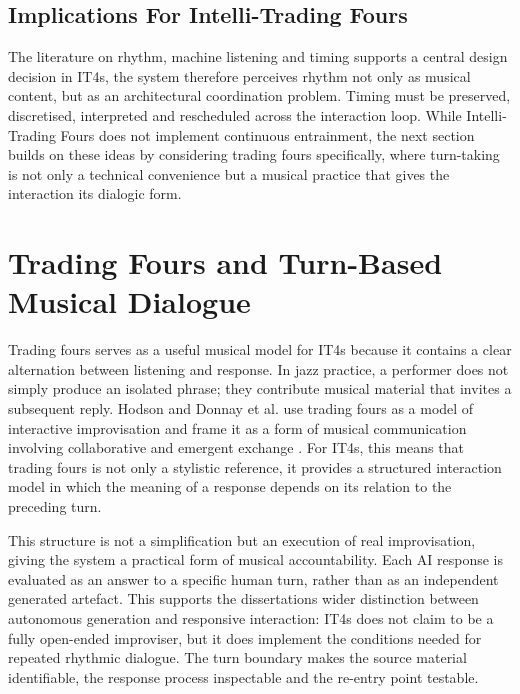 \subsection{Implications For Intelli-Trading Fours}\label{implications-for-intelli-trading-fours}

The literature on rhythm, machine listening and timing supports a
central design decision in IT4s, the system therefore perceives rhythm
not only as musical content, but as an architectural coordination
problem. Timing must be preserved, discretised, interpreted and
rescheduled across the interaction loop. While Intelli-Trading Fours
does not implement continuous entrainment, the next section builds on
these ideas by considering trading fours specifically, where turn-taking
is not only a technical convenience but a musical practice that gives
the interaction its dialogic form.

\section{Trading Fours and Turn-Based Musical Dialogue}\label{trading-fours-and-turn-based-musical-dialogue}

Trading fours serves as a useful musical model for IT4s because it
contains a clear alternation between listening and response. In jazz
practice, a performer does not simply produce an isolated phrase; they
contribute musical material that invites a subsequent reply. Hodson and
Donnay et al. use trading fours as a model of interactive improvisation
and frame it as a form of musical communication involving collaborative
and emergent exchange \citep{donnay2014neural,hodson2007interaction}. For IT4s,
this means that trading fours is not only a stylistic reference, it
provides a structured interaction model in which the meaning of a
response depends on its relation to the preceding turn.

This structure is not a simplification but an execution of real
improvisation, giving the system a practical form of musical
accountability. Each AI response is evaluated as an answer to a specific
human turn, rather than as an independent generated artefact. This
supports the dissertation\textquotesingle s wider distinction between
autonomous generation and responsive interaction: IT4s does not claim to
be a fully open-ended improviser, but it does implement the conditions
needed for repeated rhythmic dialogue. The turn boundary makes the
source material identifiable, the response process inspectable and the
re-entry point testable.

